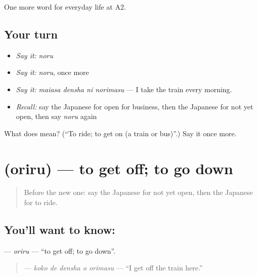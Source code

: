 \begin{grammarlens}[title={What you've built}]
One more word for everyday life at A2.
\end{grammarlens}

\subsection*{Your turn}
\begin{itemize}
\raggedright
  \item \emph{Say it:} \emph{noru}
  \item \emph{Say it:} \emph{noru}, once more
  \item \emph{Say it:} \emph{maiasa densha ni norimasu} — I take the train every morning.
  \item \emph{Recall:} say the Japanese for open for business, then the Japanese for not yet open, then say \emph{noru} again
\end{itemize}

\begin{tcolorbox}[breakable,colback=teal!4,colframe=teal!35!black,title={Before you move on}]
What does  mean? (\textquotedblleft{}To ride; to get on (a train or bus)\textquotedblright{}.) Say it once more.
\end{tcolorbox}
\section[\texorpdfstring{\ja{おりる} (oriru)}{おりる (oriru)}]{ (oriru) — to get off; to go down}

\label{lesson:JA-C198-oriru}



\begin{quote}
Before the new one: say the Japanese for not yet open, then the Japanese for to ride.
\end{quote}

\subsection*{You'll want to know: }
\textbf{} — \emph{oriru} — \textquotedblleft{}to get off; to go down\textquotedblright{}.

\begin{quote}
\textbf{  } — \emph{koko de densha o orimasu} — \textquotedblleft{}I get off the train here.\textquotedblright{}
\end{quote}

